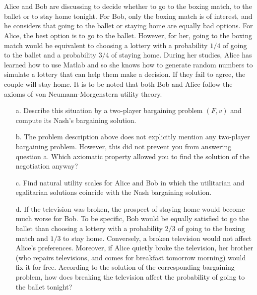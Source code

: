 \documentclass{../ape}
\begin{document}



\section{}
Alice and Bob are discussing to decide whether to go to the boxing match, to the ballet or to stay home tonight. For Bob, only the boxing match is of interest, and he considers that going to the ballet or staying home are equally bad options. For Alice, the best option is to go to the ballet. However, for her, going to the boxing match would be equivalent to choosing a lottery with a probability $1/4$ of going to the ballet and a probability $3/4$ of staying home. During her studies, Alice has learned how to use Matlab and so she knows how to generate random numbers to simulate a lottery that can help them make a decision. If they fail to agree, the couple will stay home. It is to be noted that both Bob and Alice follow the axioms of von Neumann-Morgenstern utility theory.

\begin{enumerate}
	\item[a.] Describe this situation by a two-player bargaining problem $(F,v)$ and compute its Nash's bargaining solution.
	\item[b.] The problem description above does not explicitly mention any two-player bargaining problem. However, this did not prevent you from answering question a. Which axiomatic property allowed you to find the solution of the negotiation anyway?
	\item[c.] Find natural utility scales for Alice and Bob in which the utilitarian and egalitarian solutions coincide with the Nash bargaining solution.
	\item[d.] If the television was broken, the prospect of staying home would become much worse for Bob. To be specific, Bob would be equally satisfied to go the ballet than choosing a lottery with a probability $2/3$ of going to the boxing match and $1/3$ to stay home. Conversely, a broken television would not affect Alice's preferences. Moreover, if Alice quietly broke the television, her brother (who repairs televisions, and comes for breakfast tomorrow morning) would fix it for free. According to the solution of the corresponding bargaining problem, how does breaking the television affect the probability of going to the ballet tonight?
\end{enumerate}
\end{document}
